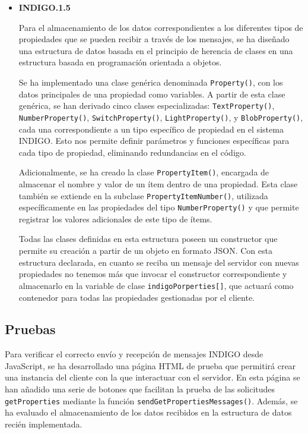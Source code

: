 \begin{itemize}[leftmargin=10mm]
	\item \textbf{INDIGO.1.5}
	
	Para el almacenamiento  de los datos correspondientes a los diferentes tipos de propiedades que se pueden recibir a través de los mensajes, se ha diseñado una estructura de datos basada en el principio de herencia de clases en una estructura basada en programación orientada a objetos.

Se ha implementado una clase genérica denominada \texttt{Property()}, con los datos principales de una propiedad como variables. A partir de esta clase genérica, se han derivado cinco clases especializadas: \texttt{TextProperty()}, \texttt{NumberProperty()}, \texttt{SwitchProperty()}, \texttt{LightProperty()}, y \texttt{BlobProperty()}, cada una correspondiente a un tipo específico de propiedad en el sistema INDIGO. Esto nos permite definir parámetros y funciones específicas para cada tipo de propiedad, eliminando redundancias en el código.

Adicionalmente, se ha creado la clase \texttt{PropertyItem()}, encargada de almacenar el nombre y valor de un ítem dentro de una propiedad. Esta clase también se extiende en la subclase \texttt{PropertyItemNumber()}, utilizada específicamente en las propiedades del tipo \texttt{NumberProperty()} y que permite registrar los valores adicionales de este tipo de ítems.

Todas las clases definidas en esta estructura poseen un constructor que permite su creación a partir de un objeto en formato JSON. Con esta estructura declarada, en cuanto se reciba un mensaje del servidor con nuevas propiedades no tenemos más que invocar el constructor correspondiente y almacenarlo en la variable de clase \texttt{indigoPorperties[]}, que actuará como contenedor para todas las propiedades gestionadas por el cliente.

\end{itemize}

\newpage

\subsection{Pruebas}

Para verificar el correcto envío y recepción de mensajes INDIGO desde JavaScript, se ha desarrollado una página HTML de prueba que permitirá crear una instancia del cliente con la que interactuar con el servidor. En esta página se han añadido una serie de botones que facilitan la prueba de las solicitudes \texttt{getProperties} mediante la función \texttt{sendGetPropertiesMessages()}. Además, se ha evaluado el almacenamiento de los datos recibidos en la estructura de datos recién implementada.

